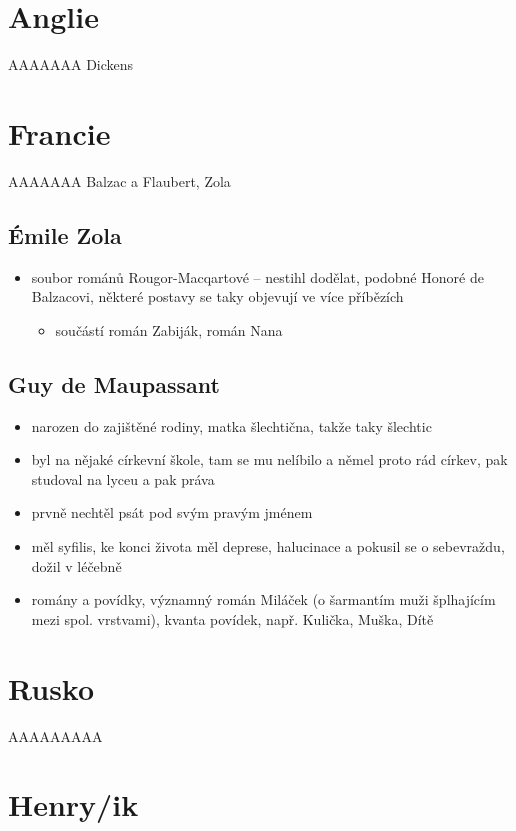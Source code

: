 \documentclass{article}
\begin{document}
\section{Anglie}
AAAAAAA Dickens

\section{Francie}
AAAAAAA Balzac a Flaubert, Zola

\subsection{Émile Zola}
\begin{itemize}
  \item soubor románů Rougor-Macqartové -- nestihl dodělat, podobné Honoré de Balzacovi, některé postavy se taky objevují ve více příbězích
  \begin{itemize}
    \item součástí román Zabiják, román Nana
  \end{itemize}
\end{itemize}

\subsection{Guy de Maupassant}
\begin{itemize}
  \item narozen do zajištěné rodiny, matka šlechtična, takže taky šlechtic
  \item byl na nějaké církevní škole, tam se mu nelíbilo a němel proto rád církev, pak studoval na lyceu a pak práva
  \item prvně nechtěl psát pod svým pravým jménem
  \item měl syfilis, ke konci života měl deprese, halucinace a pokusil se o sebevraždu, dožil v léčebně
  \item romány a povídky, významný román Miláček (o šarmantím muži šplhajícím mezi spol. vrstvami), kvanta povídek, např. Kulička, Muška, Dítě
\end{itemize}

\section{Rusko}
AAAAAAAAA

\section{Henry/ik}
\end{document}
